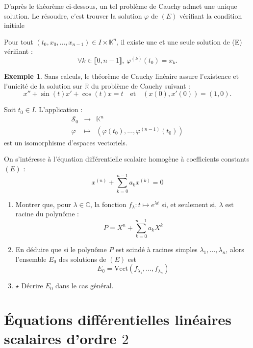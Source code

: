 \documentclass[french]{article}
\newcommand{\R}{\mathbb{R}}
\newcommand{\C}{\mathbb{C}}
\newcommand{\K}{\mathbb{K}}
\theoremstyle{plain}
\theoremstyle{definition}
\newtheorem*{ex}{Exemple}
\theoremstyle{remark}
\begin{document}
D'après le théorème ci-dessous, un tel problème de Cauchy admet une unique solution. Le résoudre, c'est trouver la solution $\varphi$ de $(E)$ vérifiant la condition initiale

\begin{thm}%
	Pour tout $(t_0,x_0,\ldots,x_{n-1})\in I\times\K^n$, il existe une et une seule solution de (E) vérifiant :
	$$\forall k\in\llbracket0,n-1\rrbracket,\ \varphi^{(k)}(t_0)=x_k.$$
\end{thm}

\begin{ex}
	Sans calculs, le théorème de Cauchy linéaire assure l'existence et l'unicité de la solution sur $\R$ du problème de Cauchy suivant :
	$$x''+\sin(t)x'+\cos(t)x=t\quad\text{et}\quad (x(0),x'(0))=(1,0).$$
\end{ex}

\begin{cor}%
	Soit $t_0\in I$. L'application :
	$$\begin{array}{rcl}
		\mathcal{S}_0&\longrightarrow&\K^n\\
		\varphi&\longmapsto&(\varphi(t_0),\ldots,\varphi^{(n-1)}(t_0))
	\end{array}$$ est un isomorphisme d'espaces vectoriels.
\end{cor}

\begin{exo}
	On s'intéresse à l'équation différentielle scalaire homogène à coefficients constants $(E)$ : $$x^{(n)}+\sum_{k=0}^{n-1}a_kx^{(k)}=0$$
	\begin{enumerate}
		\item Montrer que, pour $\lambda\in\C$, la fonction $f_\lambda :t\mapsto e^{\lambda t}$ si, et seulement si, $\lambda$ est racine du polynôme : $$P=X^n+\sum_{k=0}^{n-1}a_kX^k$$
		\item En déduire que si le polynôme $P$ est scindé à racines simples $\lambda_1,\ldots,\lambda_n$, alors l'ensemble $E_0$ des solutions de $(E)$ est $$E_0=\text{Vect}(f_{\lambda_1},\ldots,f_{\lambda_n})$$
		\item $\star$ Décrire $E_0$ dans le cas général.
	\end{enumerate}
\end{exo}

\section{Équations différentielles linéaires scalaires d'ordre $2$}
\end{document}
